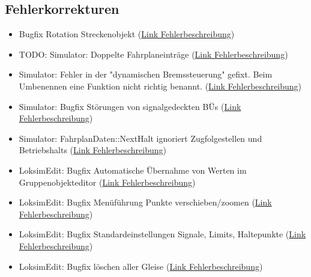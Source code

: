 \subsection{Fehlerkorrekturen}
\begin{itemize}
    \item Bugfix Rotation Streckenobjekt (\href{https://www.loksimulatoren.de/forum/index.php?thread/8430-gedrehte-streckenobjekte-ab-dem-2-modul-in-der-kbs-unsichtbar/}{Link Fehlerbeschreibung})
    \item TODO: Simulator: Doppelte Fahrplaneinträge (\href{https://www.loksimulatoren.de/forum/index.php?thread/8441-fehler-ebula-doppelte-haltepunkte-und-geschwindigkeitsanzeige/}{Link Fehlerbeschreibung})
    \item Simulator: Fehler in der "dynamischen Bremssteuerung" gefixt. Beim Umbenennen eine Funktion nicht richtig benannt. (\href{https://www.loksimulatoren.de/forum/index.php?thread/8442-dynamische-bremse-br427-428/&postID=137094#post137094}{Link Fehlerbeschreibung})
    \item Simulator: Bugfix Störungen von signalgedeckten BÜs (\href{https://www.loksimulatoren.de/forum/index.php?thread/5771-probleme-mit-durch-hauptsignale-%C3%BCberwachten-b%C3%BC/&postID=137100#post137100}{Link Fehlerbeschreibung})
    \item Simulator: FahrplanDaten::NextHalt ignoriert Zugfolgestellen und Betriebshalts (\href{https://www.loksimulatoren.de/forum/index.php?thread/5768-zza-anzeigen-falsch-wenn-hp-nur-als-zugfolgestelle-gekennzeichnet-ist/}{Link Fehlerbeschreibung})
    \item LoksimEdit: Bugfix Automatische Übernahme von Werten im Gruppenobjekteditor (\href{https://www.loksimulatoren.de/forum/index.php?thread/8262-speichern-von-%C3%A4nderungen-in-gruppenobjekten/}{Link Fehlerbeschreibung})
    \item LoksimEdit: Bugfix Menüführung Punkte verschieben/zoomen (\href{https://www.loksimulatoren.de/forum/index.php?thread/8431-fehler-der-men%C3%BCf%C3%BChrung-beim-verschieben-zoomen-von-objekten-im-gruppenobjektedit/}{Link Fehlerbeschreibung})
    \item LoksimEdit: Bugfix Standardeinstellungen Signale, Limits, Haltepunkte (\href{https://www.loksimulatoren.de/forum/index.php?thread/8435-standard-einstellungen-bei-signalen-werden-auch-bei-abbruch-gesetzt/}{Link Fehlerbeschreibung})
    \item LoksimEdit: Bugfix löschen aller Gleise (\href{https://www.loksimulatoren.de/forum/index.php?thread/8434-fehler-bei-l%C3%B6schen-des-letzten-gleises-einer-strecke/}{Link Fehlerbeschreibung})
\end{itemize}
